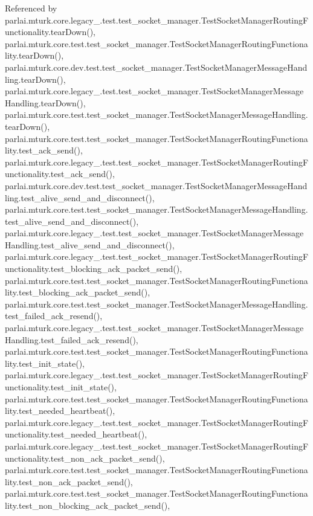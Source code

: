Referenced by parlai.\+mturk.\+core.\+legacy\+\_.\+test.\+test\+\_\+socket\+\_\+manager.\+Test\+Socket\+Manager\+Routing\+Functionality.\+tear\+Down(), parlai.\+mturk.\+core.\+test.\+test\+\_\+socket\+\_\+manager.\+Test\+Socket\+Manager\+Routing\+Functionality.\+tear\+Down(), parlai.\+mturk.\+core.\+dev.\+test.\+test\+\_\+socket\+\_\+manager.\+Test\+Socket\+Manager\+Message\+Handling.\+tear\+Down(), parlai.\+mturk.\+core.\+legacy\+\_.\+test.\+test\+\_\+socket\+\_\+manager.\+Test\+Socket\+Manager\+Message\+Handling.\+tear\+Down(), parlai.\+mturk.\+core.\+test.\+test\+\_\+socket\+\_\+manager.\+Test\+Socket\+Manager\+Message\+Handling.\+tear\+Down(), parlai.\+mturk.\+core.\+test.\+test\+\_\+socket\+\_\+manager.\+Test\+Socket\+Manager\+Routing\+Functionality.\+test\+\_\+ack\+\_\+send(), parlai.\+mturk.\+core.\+legacy\+\_.\+test.\+test\+\_\+socket\+\_\+manager.\+Test\+Socket\+Manager\+Routing\+Functionality.\+test\+\_\+ack\+\_\+send(), parlai.\+mturk.\+core.\+dev.\+test.\+test\+\_\+socket\+\_\+manager.\+Test\+Socket\+Manager\+Message\+Handling.\+test\+\_\+alive\+\_\+send\+\_\+and\+\_\+disconnect(), parlai.\+mturk.\+core.\+test.\+test\+\_\+socket\+\_\+manager.\+Test\+Socket\+Manager\+Message\+Handling.\+test\+\_\+alive\+\_\+send\+\_\+and\+\_\+disconnect(), parlai.\+mturk.\+core.\+legacy\+\_.\+test.\+test\+\_\+socket\+\_\+manager.\+Test\+Socket\+Manager\+Message\+Handling.\+test\+\_\+alive\+\_\+send\+\_\+and\+\_\+disconnect(), parlai.\+mturk.\+core.\+legacy\+\_.\+test.\+test\+\_\+socket\+\_\+manager.\+Test\+Socket\+Manager\+Routing\+Functionality.\+test\+\_\+blocking\+\_\+ack\+\_\+packet\+\_\+send(), parlai.\+mturk.\+core.\+test.\+test\+\_\+socket\+\_\+manager.\+Test\+Socket\+Manager\+Routing\+Functionality.\+test\+\_\+blocking\+\_\+ack\+\_\+packet\+\_\+send(), parlai.\+mturk.\+core.\+test.\+test\+\_\+socket\+\_\+manager.\+Test\+Socket\+Manager\+Message\+Handling.\+test\+\_\+failed\+\_\+ack\+\_\+resend(), parlai.\+mturk.\+core.\+legacy\+\_.\+test.\+test\+\_\+socket\+\_\+manager.\+Test\+Socket\+Manager\+Message\+Handling.\+test\+\_\+failed\+\_\+ack\+\_\+resend(), parlai.\+mturk.\+core.\+test.\+test\+\_\+socket\+\_\+manager.\+Test\+Socket\+Manager\+Routing\+Functionality.\+test\+\_\+init\+\_\+state(), parlai.\+mturk.\+core.\+legacy\+\_.\+test.\+test\+\_\+socket\+\_\+manager.\+Test\+Socket\+Manager\+Routing\+Functionality.\+test\+\_\+init\+\_\+state(), parlai.\+mturk.\+core.\+test.\+test\+\_\+socket\+\_\+manager.\+Test\+Socket\+Manager\+Routing\+Functionality.\+test\+\_\+needed\+\_\+heartbeat(), parlai.\+mturk.\+core.\+legacy\+\_.\+test.\+test\+\_\+socket\+\_\+manager.\+Test\+Socket\+Manager\+Routing\+Functionality.\+test\+\_\+needed\+\_\+heartbeat(), parlai.\+mturk.\+core.\+legacy\+\_.\+test.\+test\+\_\+socket\+\_\+manager.\+Test\+Socket\+Manager\+Routing\+Functionality.\+test\+\_\+non\+\_\+ack\+\_\+packet\+\_\+send(), parlai.\+mturk.\+core.\+test.\+test\+\_\+socket\+\_\+manager.\+Test\+Socket\+Manager\+Routing\+Functionality.\+test\+\_\+non\+\_\+ack\+\_\+packet\+\_\+send(), parlai.\+mturk.\+core.\+test.\+test\+\_\+socket\+\_\+manager.\+Test\+Socket\+Manager\+Routing\+Functionality.\+test\+\_\+non\+\_\+blocking\+\_\+ack\+\_\+packet\+\_\+send(), 